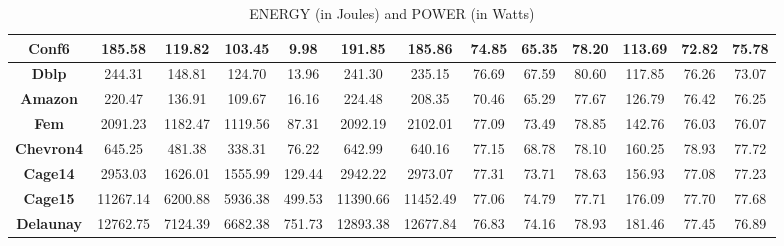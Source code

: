 \begin{itemize}
\begin{table}[th]
\begin{tabular}{ c|c|c|c|c|c|c|c|c|c|c|c|c| }
  \multicolumn{1}{|c|}{\textbf{Conf6}}
& 185.58 & 119.82 & 103.45 & \cellcolor{blue!25}9.98 & 191.85 & 185.86 & 74.85 & \cellcolor{green!25}65.35 & 78.20 & 113.69 & 72.82 & 75.78\\ \hline
  \multicolumn{1}{|c|}{\textbf{Dblp}}
& 244.31 & 148.81 & 124.70 & \cellcolor{blue!25}13.96 & 241.30 & 235.15 & 76.69 & \cellcolor{green!25}67.59 & 80.60 & 117.85 & 76.26 & 73.07\\ \hline
  \multicolumn{1}{|c|}{\textbf{Amazon}}
& 220.47 & 136.91 & 109.67 & \cellcolor{blue!25}16.16 & 224.48 & 208.35 & 70.46 & \cellcolor{green!25}65.29 & 77.67 & 126.79 & 76.42 & 76.25\\ \hline
  \multicolumn{1}{|c|}{\textbf{Fem}}
& 2091.23 & 1182.47 & 1119.56 & \cellcolor{blue!25}87.31 & 2092.19 & 2102.01 & 77.09 & \cellcolor{green!25}73.49 & 78.85 & 142.76 & 76.03 & 76.07\\ \hline
  \multicolumn{1}{|c|}{\textbf{Chevron4}}
& 645.25 & 481.38 & 338.31 & \cellcolor{blue!25}76.22 & 642.99 & 640.16 & 77.15 & \cellcolor{green!25}68.78 & 78.10 & 160.25 & 78.93 & 77.72\\ \hline
  \multicolumn{1}{|c|}{\textbf{Cage14}}
& 2953.03 & 1626.01 & 1555.99 & \cellcolor{blue!25}129.44 & 2942.22 & 2973.07 & 77.31 & \cellcolor{green!25}73.71 & 78.63 & 156.93 & 77.08 & 77.23\\ \hline
  \multicolumn{1}{|c|}{\textbf{Cage15}}
& 11267.14 & 6200.88 & 5936.38 & \cellcolor{blue!25}499.53 & 11390.66 & 11452.49 & 77.06 & \cellcolor{green!25}74.79 & 77.71 & 176.09 & 77.70 & 77.68\\ \hline
  \multicolumn{1}{|c|}{\textbf{Delaunay}}
& 12762.75 & 7124.39 & 6682.38 & \cellcolor{blue!25}751.73 & 12893.38 & 12677.84 & 76.83 & \cellcolor{green!25}74.16 & 78.93 & 181.46 & 77.45 & 76.89\\ \hline
\end{tabular}

\caption{\capfont ENERGY (in Joules) and POWER (in Watts) }
\label{tab:EnergyAndPowerTable}
\end{table}
\end{itemize}

